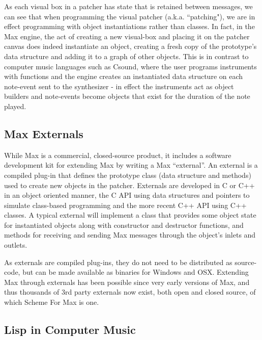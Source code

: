 \documentclass[acmsmall]{acmart}
\begin{document}
As each visual box in a patcher has state that is retained between messages, we can see that when
programming the visual patcher (a.k.a. ``patching"), we are in effect programming with
object instantiations rather than classes. In fact, in the Max engine, the act of creating
a new visual-box and placing it on the patcher canvas does indeed instantiate an object, creating
a fresh copy of the prototype's data structure and adding it to a graph of other objects.
This is in contrast to computer music languages such as Csound, where the user programs instruments 
with functions and the engine creates an instantiated data structure on each note-event sent to 
the synthesizer - in effect the instruments act as object builders and note-events become objects
that exist for the duration of the note played.


\subsection{Max Externals}

While Max is a commercial, closed-source product, it includes a software development kit for 
extending Max by writing a Max “external”. An external is a compiled plug-in that defines the  
prototype class (data structure and methods) used to create new objects in the patcher.  
Externals are developed in C or C++ in an object oriented manner, the C API using data 
structures and pointers to simulate class-based programming and the more recent C++ API using C++ classes.
A typical external will implement a class that provides some object state for instantiated
objects along with constructor and destructor functions, and  
methods for receiving and sending Max messages through the object’s inlets and outlets. 

As externals are compiled plug-ins, they do not need to be distributed as source-code, but
can be made available as binaries for Windows and OSX. Extending Max through externals has 
been possible since very early versions of Max, and thus thousands of 3rd party externals 
now exist, both open and closed source, of which Scheme For Max is one.



\subsection{Lisp in Computer Music}
\end{document}
